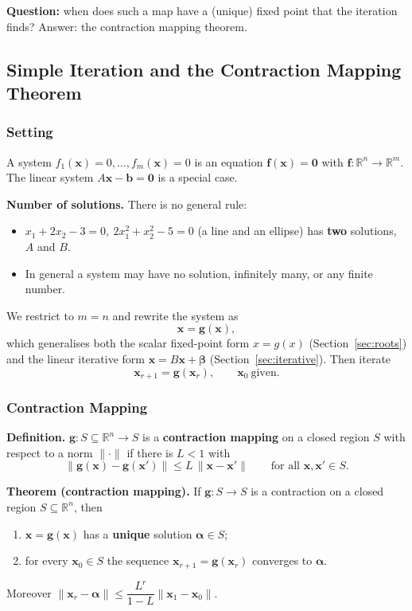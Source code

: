 \documentclass[hidelinks]{article}
\begin{document}
\textbf{Question:} when does such a map have a (unique) fixed point that the iteration finds? Answer: the contraction mapping theorem.

\subsection{Simple Iteration and the Contraction Mapping Theorem}

\subsubsection{Setting}

A system $f_1(\mathbf x)=0,\dots,f_m(\mathbf x)=0$ is an equation $\mathbf f(\mathbf x)=\mathbf 0$ with $\mathbf f:\mathbb R^n\to\mathbb R^m$. The linear system $A\mathbf x-\mathbf b=\mathbf 0$ is a special case.

\textbf{Number of solutions.} There is no general rule:
\begin{itemize}
    \item $x_1+2x_2-3=0,\ 2x_1^2+x_2^2-5=0$ (a line and an ellipse) has \textbf{two} solutions, $A$ and $B$.
    \item In general a system may have no solution, infinitely many, or any finite number.
\end{itemize}

We restrict to $m=n$ and rewrite the system as
\[
\mathbf x=\mathbf g(\mathbf x),
\]
which generalises both the scalar fixed-point form $x=g(x)$ (Section~\ref{sec:roots}) and the linear iterative form $\mathbf x=B\mathbf x+\boldsymbol\beta$ (Section~\ref{sec:iterative}). Then iterate
\[
\mathbf x_{r+1}=\mathbf g(\mathbf x_r),\qquad \mathbf x_0\ \text{given}.
\]

\subsubsection{Contraction Mapping}

\textbf{Definition.} $\mathbf g:S\subseteq\mathbb R^n\to S$ is a \textbf{contraction mapping} on a closed region $S$ with respect to a norm $\|\cdot\|$ if there is $L<1$ with
\[
\|\mathbf g(\mathbf x)-\mathbf g(\mathbf x')\|\le L\,\|\mathbf x-\mathbf x'\|\qquad\text{for all }\mathbf x,\mathbf x'\in S .
\]

\textbf{Theorem (contraction mapping).} If $\mathbf g:S\to S$ is a contraction on a closed region $S\subseteq\mathbb R^n$, then
\begin{enumerate}[label=(\roman*)]
    \item $\mathbf x=\mathbf g(\mathbf x)$ has a \textbf{unique} solution $\boldsymbol\alpha\in S$;
    \item for every $\mathbf x_0\in S$ the sequence $\mathbf x_{r+1}=\mathbf g(\mathbf x_r)$ converges to $\boldsymbol\alpha$.
\end{enumerate}
Moreover $\|\mathbf x_r-\boldsymbol\alpha\|\le\dfrac{L^r}{1-L}\|\mathbf x_1-\mathbf x_0\|$.
\end{document}

